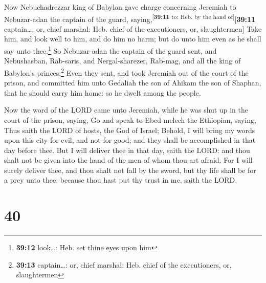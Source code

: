  Now Nebuchadrezzar king of Babylon gave charge
concerning Jeremiah to Nebuzar-adan the captain of the guard,
saying,\textsuperscript{{[}\textbf{39:11} to: Heb. by the hand
of{]}}{[}\textbf{39:11} captain\ldots: or, chief marshal: Heb. chief of
the executioners, or, slaughtermen{]}  Take him, and look
well to him, and do him no harm; but do unto him even as he shall say
unto thee.\footnote{\textbf{39:12} look\ldots: Heb. set thine eyes upon
  him}  So Nebuzar-adan the captain of the guard sent,
and Nebushasban, Rab-saris, and Nergal-sharezer, Rab-mag, and all the
king of Babylon's princes;\footnote{\textbf{39:13} captain\ldots: or,
  chief marshal: Heb. chief of the executioners, or, slaughtermen}
 Even they sent, and took Jeremiah out of the court of
the prison, and committed him unto Gedaliah the son of Ahikam the son of
Shaphan, that he should carry him home: so he dwelt among the people.

 Now the word of the LORD came unto Jeremiah, while he
was shut up in the court of the prison, saying,  Go and
speak to Ebed-melech the Ethiopian, saying, Thus saith the LORD of
hosts, the God of Israel; Behold, I will bring my words upon this city
for evil, and not for good; and they shall be accomplished in that day
before thee.  But I will deliver thee in that day, saith
the LORD: and thou shalt not be given into the hand of the men of whom
thou art afraid.  For I will surely deliver thee, and
thou shalt not fall by the sword, but thy life shall be for a prey unto
thee: because thou hast put thy trust in me, saith the LORD.

\hypertarget{section-39}{%
\section{40}\label{section-39}}

